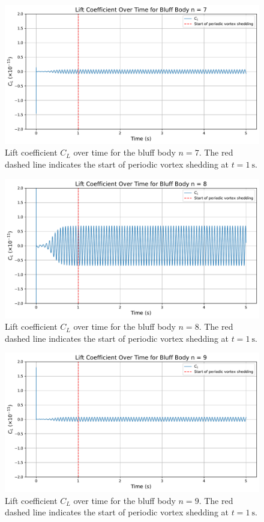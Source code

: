 \begin{figure}[H]
	\centering
	\includegraphics[width=\textwidth]{images/7face_graph}
	\caption{Lift coefficient $C_L$ over time for the bluff body $n=7$. The red dashed line indicates the start of periodic vortex shedding at $t = \SI{1}{\second}$.}
	\label{fig:7FaceGraph} 
\end{figure}

\begin{figure}[H]
	\centering
	\includegraphics[width=\textwidth]{images/8face_graph}
	\caption{Lift coefficient $C_L$ over time for the bluff body $n=8$. The red dashed line indicates the start of periodic vortex shedding at $t = \SI{1}{\second}$.}
	\label{fig:8FaceGraph} 
\end{figure}

\begin{figure}[H]
	\centering
	\includegraphics[width=\textwidth]{images/9face_graph}
	\caption{Lift coefficient $C_L$ over time for the bluff body $n=9$. The red dashed line indicates the start of periodic vortex shedding at $t = \SI{1}{\second}$.}
	\label{fig:9FaceGraph} 
\end{figure}

